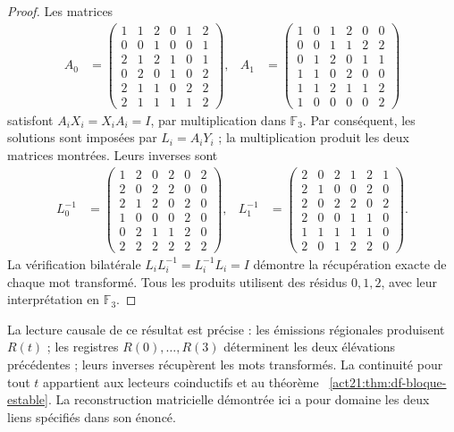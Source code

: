 \begin{proof}
Les matrices
\begin{align*}
 A_0&=\begin{pmatrix}
1&1&2&0&1&2\\0&0&1&0&0&1\\2&1&2&1&0&1\\
0&2&0&1&0&2\\2&1&1&0&2&2\\2&1&1&1&1&2
\end{pmatrix},&
 A_1&=\begin{pmatrix}
1&0&1&2&0&0\\0&0&1&1&2&2\\0&1&2&0&1&1\\
1&1&0&2&0&0\\1&1&2&1&1&2\\1&0&0&0&0&2
\end{pmatrix}
\end{align*}
satisfont \(A_iX_i=X_iA_i=I\), par multiplication dans \(\mathbb F_3\).
Par conséquent, les solutions sont imposées par \(L_i=A_iY_i\) ; la
multiplication produit les deux matrices montrées. Leurs inverses sont
\begin{align*}
 L_0^{-1}&=\begin{pmatrix}
1&2&0&2&0&2\\2&0&2&2&0&0\\2&1&2&0&2&0\\
1&0&0&0&2&0\\0&2&1&1&2&0\\2&2&2&2&2&2
\end{pmatrix},&
 L_1^{-1}&=\begin{pmatrix}
2&0&2&1&2&1\\2&1&0&0&2&0\\2&0&2&2&0&2\\
2&0&0&1&1&0\\1&1&1&1&1&0\\2&0&1&2&2&0
\end{pmatrix}.
\end{align*}
La vérification bilatérale \(L_iL_i^{-1}=L_i^{-1}L_i=I\) démontre la
récupération exacte de chaque mot transformé. Tous les produits
utilisent des résidus \(0,1,2\), avec leur interprétation en \(\mathbb F_3\).
\end{proof}

La lecture causale de ce résultat est précise : les émissions régionales produisent \(R(t)\) ; les registres \(R(0),\ldots,R(3)\) déterminent les deux élévations précédentes ; leurs inverses récupèrent les mots transformés.  
La continuité pour tout \(t\) appartient aux lecteurs coinductifs et au théorème ~\ref{act21:thm:df-bloque-estable}. La reconstruction matricielle démontrée ici a pour domaine les deux liens spécifiés dans son énoncé.

